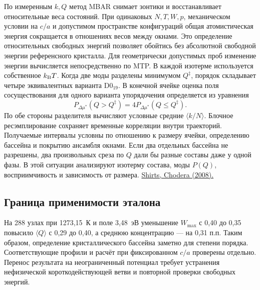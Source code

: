 По измеренным \(k,Q\) метод MBAR снимает зонтики и восстанавливает
относительные веса состояний. При одинаковых \(N,T,W,p\), механическом
условии на \(c/a\) и допустимом пространстве конфигураций общая
атомистическая энергия сокращается в отношениях весов между окнами.
Это определение относительных свободных энергий позволяет обойтись
без абсолютной свободной энергии референсного кристалла. Для геометрически
допустимых проб изменение энергии вычисляется непосредственно по MTP. В каждой
изотерме используется собственное \(k_{\rm B}T\).
Когда две моды разделены минимумом \(Q^\ddagger\), порядок складывает
четыре эквивалентных варианта D0$_{19}$. В конечной ячейке оценка поля
сосуществования для одного варианта упорядочения определяется из уравнения
\[
 P_{\Delta\mu^*}(Q>Q^\ddagger)=4P_{\Delta\mu^*}(Q\le Q^\ddagger).
\]
По обе стороны разделителя вычисляют условные средние
\(\langle k/N\rangle\). Блочное ресэмплирование сохраняет временные
корреляции внутри траекторий. Получаемые интервалы условны по отношению
к размеру ячейки, определению бассейна и покрытию ансамбля окнами.
Если два отдельных бассейна не разрешены, два произвольных среза по \(Q\)
дали бы разные составы даже у одной фазы. В этой ситуации анализируют
изотерму состава, моды \(P(Q)\), восприимчивость и зависимость от размера.
\href{https://doi.org/10.1063/1.2978177}{Shirts, Chodera (2008).}

\subsection*{Граница применимости эталона}
На 288 узлах при 1273,15~К и поле 3,48~эВ уменьшение \(W_{\max}\)
с 0,40 до 0,35 повысило \(\langle Q\rangle\) с 0,29 до 0,40,
а среднюю концентрацию --- на 0,31 п.п. Таким образом, определение
кристаллического бассейна заметно для степени порядка. Соответствующие
профили и расчёт при фиксированном \(c/a\) проверены отдельно. Перенос
результата на неограниченный потенциал требует устранения нефизической
короткодействующей ветви и повторной проверки свободных энергий.

